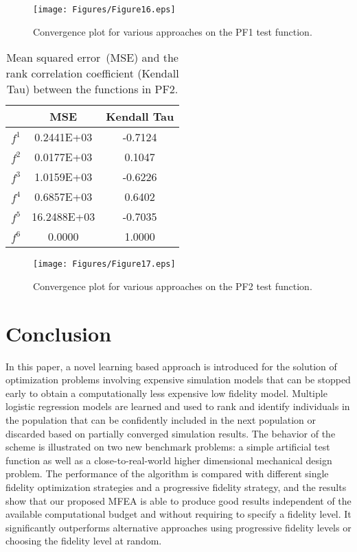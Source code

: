 \begin{figure}[!htb]
	\centering
	\texttt{[image: Figures/Figure16.eps]}
	\caption{Convergence plot for various approaches on the PF1 test function.}
	\label{fig:pf1}
\end{figure} 

\begin{table}[!htb]
	\caption{Mean squared error~(MSE) and the rank correlation coefficient (Kendall Tau) between the functions in PF2.}
	\label{table:mse_tau_pf2}
	\begin{center}
		\begin{tabular}{c|c|c}
			\hline
			&MSE&Kendall Tau\\
			\hline
			$f^1$ &0.2441E+03 & -0.7124 \\
			$f^2$ &0.0177E+03 & 0.1047\\
			$f^3$ &1.0159E+03 & -0.6226\\
			$f^4$ &0.6857E+03 & 0.6402\\
			$f^5$ &16.2488E+03 & -0.7035\\
			$f^6$ &0.0000 & 1.0000\\
			\hline
		\end{tabular}
	\end{center}
\end{table}

\begin{figure}[!htb]
	\centering
	\texttt{[image: Figures/Figure17.eps]}
	\caption{Convergence plot for various approaches on the PF2 test function.}
	\label{fig:pf2}
\end{figure}


\section{Conclusion}
In this paper, a novel learning based approach is introduced for the solution of optimization problems involving expensive simulation models that can be stopped early to obtain a computationally less expensive low fidelity model. Multiple logistic regression models are learned and used to rank and identify individuals in the population that can be confidently included in the next population or discarded based on partially converged simulation results. The behavior of the scheme is illustrated on two new benchmark problems: a simple artificial test function as well as a close-to-real-world higher dimensional mechanical design problem. The performance of the algorithm is compared with different single fidelity optimization strategies and a progressive fidelity strategy, and the results show that our proposed MFEA is able to produce good results independent of the available computational budget and without requiring to specify a fidelity level. It significantly outperforms alternative approaches using progressive fidelity levels or choosing the fidelity level at random.


